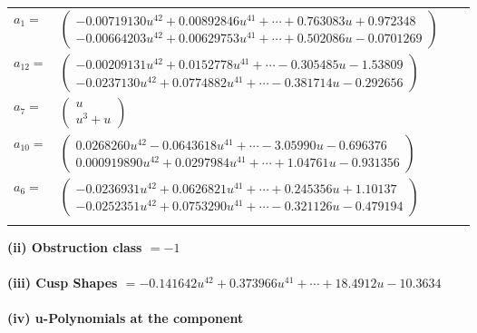 \documentclass[1p]{elsarticle_modified}
\theoremstyle{definition}
\begin{document}
\begin{tabular}{m{7pt} m{180pt} m{7pt} m{180pt} }
\flushright $a_{1}=$&$\begin{pmatrix}-0.00719130 u^{42}+0.00892846 u^{41}+\cdots+0.763083 u+0.972348\\-0.00664203 u^{42}+0.00629753 u^{41}+\cdots+0.502086 u-0.0701269\end{pmatrix}$ \\
\flushright $a_{12}=$&$\begin{pmatrix}-0.00209131 u^{42}+0.0152778 u^{41}+\cdots-0.305485 u-1.53809\\-0.0237130 u^{42}+0.0774882 u^{41}+\cdots-0.381714 u-0.292656\end{pmatrix}$ \\
\flushright $a_{7}=$&$\begin{pmatrix}u\\u^3+u\end{pmatrix}$ \\
\flushright $a_{10}=$&$\begin{pmatrix}0.0268260 u^{42}-0.0643618 u^{41}+\cdots-3.05990 u-0.696376\\0.000919890 u^{42}+0.0297984 u^{41}+\cdots+1.04761 u-0.931356\end{pmatrix}$ \\
\flushright $a_{6}=$&$\begin{pmatrix}-0.0236931 u^{42}+0.0626821 u^{41}+\cdots+0.245356 u+1.10137\\-0.0252351 u^{42}+0.0753290 u^{41}+\cdots-0.321126 u-0.479194\end{pmatrix}$\\&\end{tabular}
\flushleft \textbf{(ii) Obstruction class $= -1$}\\~\\
\flushleft \textbf{(iii) Cusp Shapes $= -0.141642 u^{42}+0.373966 u^{41}+\cdots+18.4912 u-10.3634$}\\~\\
\newpage\renewcommand{\arraystretch}{1}
\flushleft \textbf{(iv) u-Polynomials at the component}\newline \\
\end{document}
